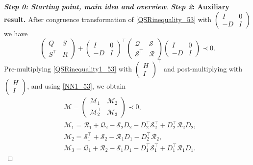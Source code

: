 \documentclass[11pt,a4paper,oneside,DIV=12,headings=small]{scrartcl}
\newcommand{\cS}{\mathcal{S}}
\newcommand{\cQ}{\mathcal{Q}}
\newcommand{\cM}{\mathcal{M}}
\newcommand{\cR}{\mathcal{R}}
\theoremstyle{plain}
\begin{document}
\begin{proof}[\textbf{Step 0: \emph{Starting point, main idea and overview}}]
\medskip

\textbf{\emph{Step 2}: Auxiliary result.} \newline
After congruence transformation of \eqref{QSRinequality_53} with $\left(\begin{smallmatrix} I & 0 \\ -D & I \end{smallmatrix}\right)$ we have 
\begin{equation}
\label{QSRinequality1_53}
\begin{pmatrix} Q & S \\ S^\top & R \end{pmatrix}+
\begin{pmatrix} I & 0 \\ -D & I \end{pmatrix}^\top
\begin{pmatrix} \cQ & \cS \\ \cS^\top & \cR \end{pmatrix}
\begin{pmatrix} I & 0 \\ -D & I \end{pmatrix} \prec 0.
\end{equation}
Pre-multiplying \eqref{QSRinequality1_53} with $\left(\begin{smallmatrix} H \\ I \end{smallmatrix}\right)^\top$ and post-multiplying with $\left(\begin{smallmatrix} H \\ I \end{smallmatrix}\right)$, and using \eqref{NN1_53}, we obtain
\begin{align}
&\cM = \begin{pmatrix} \cM_1 & \cM_2 \\ \cM_2^\top & \cM_3 \end{pmatrix} \prec 0, \label{StructuredQSR_53} \\
& \cM_1=\cR_1+\cQ_2-\cS_2 D_2 - D_2^\top \cS_2^\top + D_2^\top \cR_2 D_2, \nonumber \\
& \cM_2=\cS_1^\top + \cS_2 - \cR_1 D_1 - D_2^\top \cR_2, \nonumber \\
&\cM_3= \cQ_1+\cR_2-\cS_1 D_1 - D_1^\top \cS_1^\top + D_1^\top \cR_1 D_1. \nonumber
\end{align}

\medskip 


\end{proof}
\end{document}
